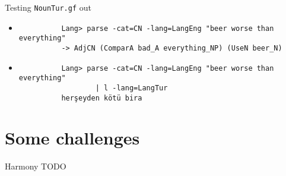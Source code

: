 \documentclass{beamer}
\begin{document}
  \begin{frame}[fragile]{Testing \texttt{NounTur.gf} out}
    \begin{itemize}
      \item<1->
        \begin{lstlisting}
          Lang> parse -cat=CN -lang=LangEng "beer worse than everything"
          -> AdjCN (ComparA bad_A everything_NP) (UseN beer_N)
        \end{lstlisting}
      \item<2->
        \begin{lstlisting}
          Lang> parse -cat=CN -lang=LangEng "beer worse than everything"
                  | l -lang=LangTur
          herşeyden kötü bira
        \end{lstlisting}
    \end{itemize}
  \end{frame}

  \section{Some challenges}

  \begin{frame}{Harmony}
    TODO
  \end{frame}
\end{document}

